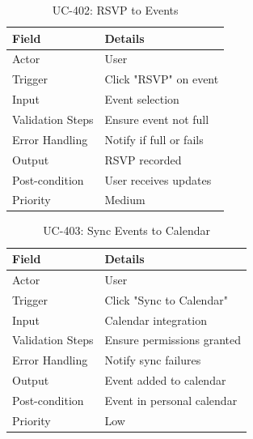 \begin{table}[H]
\centering
\caption{UC-402: RSVP to Events}
\begin{tabular}{|l|p{10cm}|}
\hline
\textbf{Field} & \textbf{Details} \\ \hline
Actor & User \\ \hline
Trigger & Click "RSVP" on event \\ \hline
Input & Event selection \\ \hline
Validation Steps & Ensure event not full \\ \hline
Error Handling & Notify if full or fails \\ \hline
Output & RSVP recorded \\ \hline
Post-condition & User receives updates \\ \hline
Priority & Medium \\ \hline
\end{tabular}
\end{table}

\begin{table}[H]
\centering
\caption{UC-403: Sync Events to Calendar}
\begin{tabular}{|l|p{10cm}|}
\hline
\textbf{Field} & \textbf{Details} \\ \hline
Actor & User \\ \hline
Trigger & Click "Sync to Calendar" \\ \hline
Input & Calendar integration \\ \hline
Validation Steps & Ensure permissions granted \\ \hline
Error Handling & Notify sync failures \\ \hline
Output & Event added to calendar \\ \hline
Post-condition & Event in personal calendar \\ \hline
Priority & Low \\ \hline
\end{tabular}
\end{table}